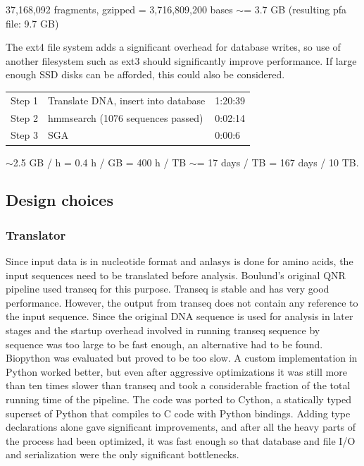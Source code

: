 \documentclass[a4paper,12pt]{article}
\begin{document}
37,168,092 fragments, gzipped = 3,716,809,200 bases $\sim$= 3.7 GB (resulting pfa file: 9.7 GB)

The ext4 file system adds a significant overhead for database writes, so use of another filesystem such as ext3 should significantly improve performance. If large enough SSD disks can be afforded, this could also be considered.

\begin{tabular}{lll}
Step 1&Translate DNA, insert into database&1:20:39\\
Step 2&hmmsearch (1076 sequences passed)&0:02:14\\
Step 3&SGA&0:00:6
\end{tabular}


$\sim$2.5 GB / h = 0.4 h / GB = 400 h / TB $\sim$= 17 days / TB = 167 days / 10 TB.


 
\subsection{Design choices}
\subsubsection{Translator}
Since input data is in nucleotide format and anlasys is done for amino acids, the input sequences need to be translated before analysis. Boulund's original QNR pipeline used transeq for this purpose. Transeq is stable and has very good performance. However, the output from transeq does not contain any reference to the input sequence. Since the original DNA sequence is used for analysis in later stages and the startup overhead involved in running transeq sequence by sequence was too large to be fast enough, an alternative had to be found. Biopython was evaluated but proved to be too slow. A custom implementation in Python worked better, but even after aggressive optimizations it was still more than ten times slower than transeq and took a considerable fraction of the total running time of the pipeline. The code was ported to Cython, a statically typed superset of Python that compiles to C code with Python bindings. Adding type declarations alone gave significant improvements, and after all the heavy parts of the process had been optimized, it was fast enough so that database and file I/O and serialization were the only significant bottlenecks.
\end{document}
